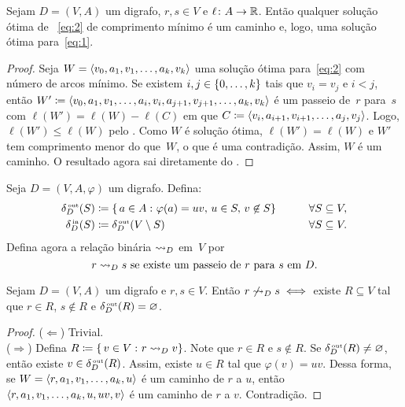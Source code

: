 \documentclass[10pt,reqno]{amsart}
\begin{document}
\begin{proposition}
  \label{prop:1}
  Sejam \(D = (V,A)\) um digrafo, \(r,s \in V\) e
  \(\ell \colon A \to \Reals\).  Então qualquer solução ótima de
  ~\eqref{eq:2} de comprimento mínimo é um caminho e, logo, uma
  solução ótima para~\eqref{eq:1}.
\end{proposition}
\begin{proof}
  Seja \(W = \seq{v_0,a_1,v_1,\dotsc,a_k,v_k}\) uma solução ótima
  para~\eqref{eq:2} com número de arcos mínimo.  Se existem
  \(i,j \in \set{0,\dotsc,k}\) tais que \(v_i = v_j\) e \(i < j\),
  então
  \(W' \coloneqq
  \seq{v_0,a_1,v_1,\dotsc,a_i,v_i,a_{j+1},v_{j+1},\dotsc,a_k,v_k}\) é
  um passeio de~\(r\) para~\(s\) com \(\ell(W') = \ell(W) - \ell(C)\) em que
  \(C \coloneqq \seq{v_i,a_{i+1},v_{i+1},\dotsc,a_j,v_j}\). Logo,
  \(\ell(W') \leq \ell(W)\) pelo .  Como \(W\) é solução ótima,
  \(\ell(W') = \ell(W)\) e \(W'\) tem comprimento menor do que~\(W\), o que
  é uma contradição.  Assim, \(W\) é um caminho.  O resultado agora sai
  diretamente do .
\end{proof}

Seja \(D = (V,A,\varphi)\) um digrafo.  Defina:
\begin{alignat*}{2}
  \label{eq:4}
  \deltaout[D](S)
  & \coloneqq
  \setst{
    a \in A
  }{
    \varphi(a) = uv,\,
    u \in S,\,
    v \not\in S
  }
  & \qquad &
  \forall S \subseteq V,
  \\
  \deltain[D](S)
  & \coloneqq
  \deltaout[D](V \setminus S)
  & \qquad &
  \forall S \subseteq V.
\end{alignat*}
Defina agora a relação binária \(\reaches_D\) em~\(V\) por
\begin{equation*}
  r \reaches_D s
  \text{ se existe um passeio de~\(r\) para~\(s\) em~\(D\)}.
\end{equation*}

\begin{theorem}
  Sejam \(D = (V,A)\) um digrafo e \(r,s \in V\).  Então
  \(r \not\reaches_D s \iff\) existe \(R \subseteq V\) tal que
  \(r \in R\), \(s \not\in R\) e \(\deltaout[D](R) = \emptyset\).
\end{theorem}
\begin{proof}
(\(\Leftarrow\)) Trivial.
\\ (\(\Rightarrow\)) Defina \(R \coloneqq \setst{v \in V}{r \reaches_D v}\).
   Note que \(r \in R\) e \(s \notin R\). Se \(\deltaout[D](R) \neq \emptyset\), 
   então existe \(v \in \deltaout[D](R)\). Assim, existe \(u \in R\) tal que
   \(\varphi(v) = uv\). Dessa forma, se \(W = \seq{r,a_1,v_1,\dotsc,a_k,u}\) 
   é um caminho de \(r\) a \(u\), então \(\seq{r,a_1,v_1,\dotsc,a_k,u,uv,v}\)
   é um caminho de \(r\) a \(v\). Contradição.
\end{proof}
\end{document}
